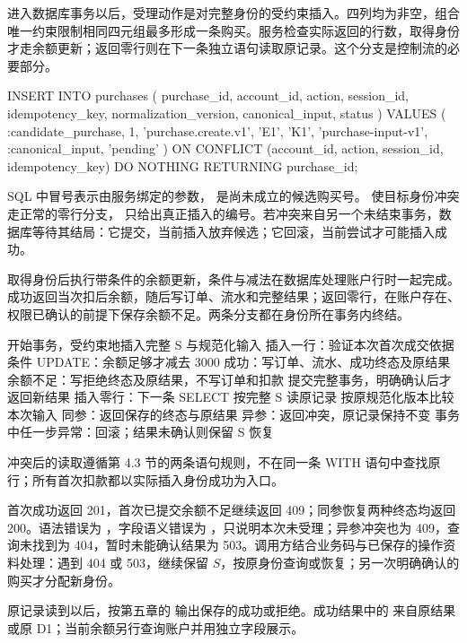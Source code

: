 进入数据库事务以后，受理动作是对完整身份的受约束插入。四列均为非空，组合唯一约束限制相同四元组最多形成一条购买。服务检查实际返回的行数，取得身份才走余额更新；返回零行则在下一条独立语句读取原记录。这个分支是控制流的必要部分。

\begin{BookCode}
INSERT INTO purchases (
  purchase_id, account_id, action, session_id,
  idempotency_key, normalization_version,
  canonical_input, status
) VALUES (
  :candidate_purchase, 1, 'purchase.create.v1', 'E1',
  'K1', 'purchase-input-v1', :canonical_input, 'pending'
)
ON CONFLICT (account_id, action, session_id, idempotency_key)
DO NOTHING
RETURNING purchase_id;
\end{BookCode}

SQL 中冒号表示由服务绑定的参数， 是尚未成立的候选购买号。 使目标身份冲突走正常的零行分支， 只给出真正插入的编号。若冲突来自另一个未结束事务，数据库等待其结局：它提交，当前插入放弃候选；它回滚，当前尝试才可能插入成功。

取得身份后执行带条件的余额更新，条件与减法在数据库处理账户行时一起完成。成功返回当次扣后余额，随后写订单、流水和完整结果；返回零行，在账户存在、权限已确认的前提下保存余额不足。两条分支都在身份所在事务内终结。

\begin{BookCode}
开始事务，受约束地插入完整 S 与规范化输入
插入一行：验证本次首次成交依据
    条件 UPDATE：余额足够才减去 3000
    成功：写订单、流水、成功终态及原结果
    余额不足：写拒绝终态及原结果，不写订单和扣款
    提交完整事务，明确确认后才返回新结果
插入零行：下一条 SELECT 按完整 S 读原记录
    按原规范化版本比较本次输入
    同参：返回保存的终态与原结果
    异参：返回冲突，原记录保持不变
事务中任一步异常：回滚；结果未确认则保留 S 恢复
\end{BookCode}



冲突后的读取遵循第 4.3 节的两条语句规则，不在同一条 WITH 语句中查找原行；所有首次扣款都以实际插入身份成功为入口。

首次成功返回 201，首次已提交余额不足继续返回 409；同参恢复两种终态均返回 200。语法错误为 ，字段语义错误为 ，只说明本次未受理；异参冲突也为 409，查询未找到为 404，暂时未能确认结果为 503。调用方结合业务码与已保存的操作资料处理：遇到 404 或 503，继续保留 \(S\)，按原身份查询或恢复；另一次明确确认的购买才分配新身份。

原记录读到以后，按第五章的  输出保存的成功或拒绝。成功结果中的  来自原结果或原 D1；当前余额另行查询账户并用独立字段展示。


